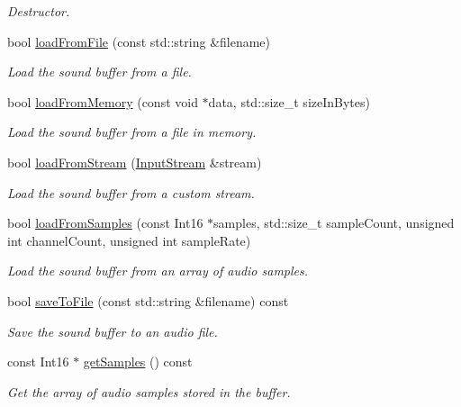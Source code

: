 \begin{DoxyCompactItemize}
\begin{DoxyCompactList}\small\item\em Destructor. \end{DoxyCompactList}\item 
bool \hyperlink{classsf_1_1SoundBuffer_a2be6a8025c97eb622a7dff6cf2594394}{load\-From\-File} (const std\-::string \&filename)
\begin{DoxyCompactList}\small\item\em Load the sound buffer from a file. \end{DoxyCompactList}\item 
bool \hyperlink{classsf_1_1SoundBuffer_af8cfa5599739a7edae69c5cba273d33f}{load\-From\-Memory} (const void $\ast$data, std\-::size\-\_\-t size\-In\-Bytes)
\begin{DoxyCompactList}\small\item\em Load the sound buffer from a file in memory. \end{DoxyCompactList}\item 
bool \hyperlink{classsf_1_1SoundBuffer_ad292156b1e01f6dabd4c0c277d5e079e}{load\-From\-Stream} (\hyperlink{classsf_1_1InputStream}{Input\-Stream} \&stream)
\begin{DoxyCompactList}\small\item\em Load the sound buffer from a custom stream. \end{DoxyCompactList}\item 
bool \hyperlink{classsf_1_1SoundBuffer_a63da986e144b578135edd48e51c565e8}{load\-From\-Samples} (const Int16 $\ast$samples, std\-::size\-\_\-t sample\-Count, unsigned int channel\-Count, unsigned int sample\-Rate)
\begin{DoxyCompactList}\small\item\em Load the sound buffer from an array of audio samples. \end{DoxyCompactList}\item 
bool \hyperlink{classsf_1_1SoundBuffer_ab2083dc1a934c64959d9e3f162328a76}{save\-To\-File} (const std\-::string \&filename) const 
\begin{DoxyCompactList}\small\item\em Save the sound buffer to an audio file. \end{DoxyCompactList}\item 
const Int16 $\ast$ \hyperlink{classsf_1_1SoundBuffer_a4ba0c1e5b5be500af42de30b1360eb2e}{get\-Samples} () const 
\begin{DoxyCompactList}\small\item\em Get the array of audio samples stored in the buffer. \end{DoxyCompactList}\item 

\end{DoxyCompactItemize}
